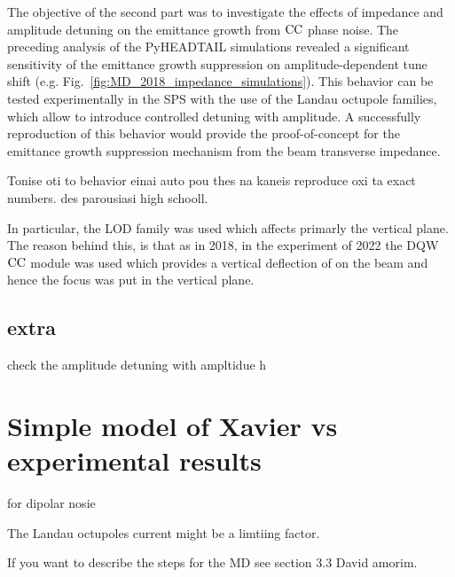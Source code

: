 The objective of the second part was to investigate the effects of impedance and amplitude detuning on the emittance growth from ${\mathrm{CC}}$ phase noise. The preceding analysis of the PyHEADTAIL simulations revealed a significant sensitivity of the emittance growth suppression on amplitude-dependent tune shift (e.g. Fig.~\ref{fig:MD_2018_impedance_simulations}). This behavior can be tested experimentally in the SPS with the use of the Landau octupole families, which allow to introduce controlled detuning with amplitude. A successfully reproduction of this behavior would provide the proof-of-concept for the emittance growth suppression mechanism from the beam transverse impedance.




Tonise oti to behavior einai auto pou thes na kaneis reproduce oxi ta exact numbers. des parousiasi high schooll.


In particular, the LOD family was used which affects primarly the vertical plane. The reason behind this, is that as in 2018, in the experiment of 2022 the DQW ${\mathrm{CC}}$ module was used which provides a vertical deflection of on the beam and hence the focus was put in the vertical plane.


\subsection{extra}
check the amplitude detuning with ampltidue
h%


\section{Simple model of Xavier vs experimental results}
for dipolar nosie


The Landau octupoles current might be a limtiing factor.


If you want to describe the steps for the MD see section 3.3 David amorim.